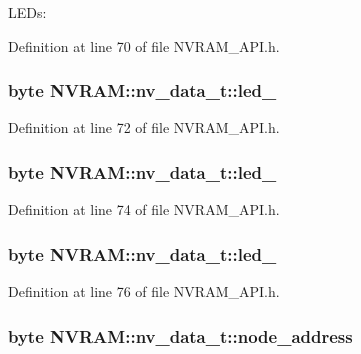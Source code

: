 L\-E\-Ds\-: 



Definition at line 70 of file N\-V\-R\-A\-M\-\_\-\-A\-P\-I.\-h.

\hypertarget{struct_n_v_r_a_m_1_1nv__data__t_ac0b273dc325fd6318bc0a44ce6c58137}{
\subsubsection[{led\-\_\-2}]{\setlength{\rightskip}{0pt plus 5cm}byte N\-V\-R\-A\-M\-::nv\-\_\-data\-\_\-t\-::led\-\_}}\label{struct_n_v_r_a_m_1_1nv__data__t_ac0b273dc325fd6318bc0a44ce6c58137}


Definition at line 72 of file N\-V\-R\-A\-M\-\_\-\-A\-P\-I.\-h.

\hypertarget{struct_n_v_r_a_m_1_1nv__data__t_a0408ab135e8e2618fce88c4185f84751}{
\subsubsection[{led\-\_\-3}]{\setlength{\rightskip}{0pt plus 5cm}byte N\-V\-R\-A\-M\-::nv\-\_\-data\-\_\-t\-::led\-\_}}\label{struct_n_v_r_a_m_1_1nv__data__t_a0408ab135e8e2618fce88c4185f84751}


Definition at line 74 of file N\-V\-R\-A\-M\-\_\-\-A\-P\-I.\-h.

\hypertarget{struct_n_v_r_a_m_1_1nv__data__t_a4193a514c5d1d34274d3edb0aa6dfb42}{
\subsubsection[{led\-\_\-4}]{\setlength{\rightskip}{0pt plus 5cm}byte N\-V\-R\-A\-M\-::nv\-\_\-data\-\_\-t\-::led\-\_}}\label{struct_n_v_r_a_m_1_1nv__data__t_a4193a514c5d1d34274d3edb0aa6dfb42}


Definition at line 76 of file N\-V\-R\-A\-M\-\_\-\-A\-P\-I.\-h.

\hypertarget{struct_n_v_r_a_m_1_1nv__data__t_af8f268b2dd52e9268d7ef9cca4cd6a46}{
\subsubsection[{node\-\_\-address}]{\setlength{\rightskip}{0pt plus 5cm}byte N\-V\-R\-A\-M\-::nv\-\_\-data\-\_\-t\-::node\-\_\-address}}\label{struct_n_v_r_a_m_1_1nv__data__t_af8f268b2dd52e9268d7ef9cca4cd6a46}


